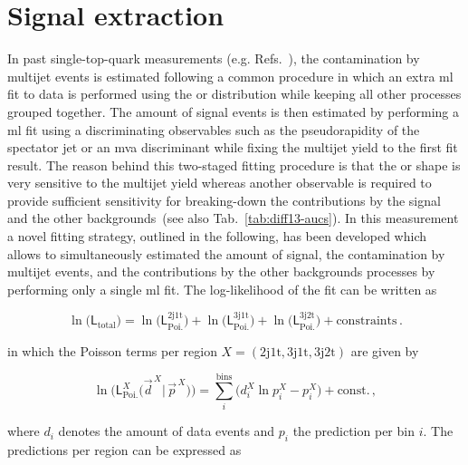 \section{Signal extraction}
\label{sec:diff13-fit}

In past single-top-quark measurements (e.g. Refs.~\cite{Khachatryan:2015dzz,Khachatryan:2014iya,Sirunyan:2016cdg}), the contamination by multijet events is estimated following a common procedure in which an extra \gls{ml} fit to data is performed using the \mtw or \met distribution while keeping all other processes grouped together. The amount of signal events is then estimated by performing a \gls{ml} fit using a discriminating observables such as the pseudorapidity of the spectator jet or an \gls{mva} discriminant while fixing the multijet yield to the first fit result. The reason behind this two-staged fitting procedure is that the \mtw or \met shape is very sensitive to the multijet yield whereas another observable is required to provide sufficient sensitivity for breaking-down the contributions by the signal and the other backgrounds~(see also Tab.~\ref{tab:diff13-aucs}). In this measurement a novel fitting strategy, outlined in the following, has been developed which allows to simultaneously estimated the amount of signal, the contamination by multijet events, and the contributions by the other backgrounds processes by performing only a single \gls{ml} fit. The log-likelihood of the fit can be written as

\begin{equation}
\ln\big(\mathsf{L}_\mathrm{total}\big)=\ln\big(\mathsf{L}^\mathrm{2j1t}_\mathrm{Poi.}\big)+\ln\big(\mathsf{L}_\mathrm{Poi.}^\mathrm{3j1t}\big)+\ln\big(\mathsf{L}_\mathrm{Poi.}^\mathrm{3j2t}\big)+\mathrm{constraints}\,.
\end{equation}

in which the Poisson terms per region $X=(\mathrm{2j1t, 3j1t, 3j2t})$ are given by

\begin{equation}
\ln\Big(\mathsf{L}^{X}_\mathrm{Poi.}\big(\vec{d}^{\,X}|\,\vec{p}^{\,X}\big)\Big)=\sum_{i}^\mathrm{bins}\Big(d_{i}^{X}\ln p_{i}^{X}-p_{i}^{X}\Big)+\mathrm{const.}\,,
\end{equation}

where $d_{i}$ denotes the amount of data events and $p_{i}$ the prediction per bin $i$. The predictions per region can be expressed as

